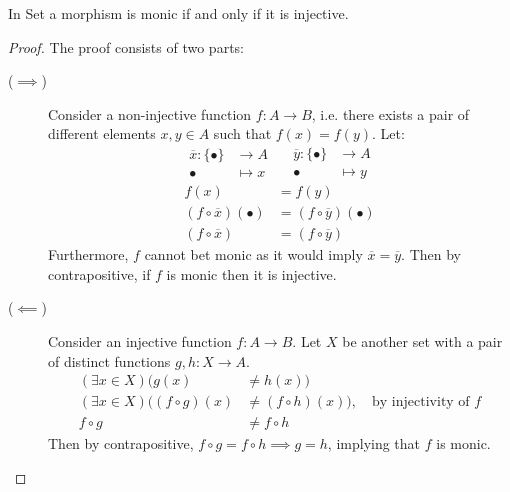 \begin{theorem}\label{thm:mono_iff_inj}
  In Set a morphism is monic if and only if it is injective.

  \begin{proof}
    The proof consists of two parts:
    \begin{description}
      \item[($\implies$)] Consider a non-injective function $f:A\to B$, i.e.
        there exists a pair of different elements $x,y\in A$ such that
        $f(x)=f(y)$. Let:
        \[
          \begin{aligned}
            \overline{x} : \{\bullet\} &\to A\\
            \bullet &\mapsto x
          \end{aligned}
          \quad
          \begin{aligned}
            \overline{y} : \{\bullet\} &\to A\\
            \bullet &\mapsto y
          \end{aligned}
        \]
        \[
          \begin{aligned}
            f(x) &= f(y)\\
            (f\circ\overline{x})(\bullet) &= (f\circ\overline{y})(\bullet)\\
            (f\circ\overline{x}) &= (f\circ\overline{y})
          \end{aligned}
        \]
        Furthermore, $f$ cannot bet monic as it would imply $\overline{x} =
        \overline{y}$. Then by contrapositive, if $f$ is monic then it is
        injective.
      \item[($\impliedby$)] Consider an injective function $f:A\to B$. Let $X$
        be another set with a pair of distinct functions $g, h:X\to A$.
        \[
          \begin{aligned}
            (\exists x\in X)(g(x) &\neq h(x))\\
            (\exists x\in X)((f\circ g)(x) &\neq (f\circ h)(x))
            ,\quad\text{by injectivity of $f$}\\
            f\circ g &\neq f\circ h
          \end{aligned}
        \]
        Then by contrapositive, $f\circ g = f\circ h \implies g = h$, implying
        that $f$ is monic.
    \end{description}
  \end{proof}
\end{theorem}

